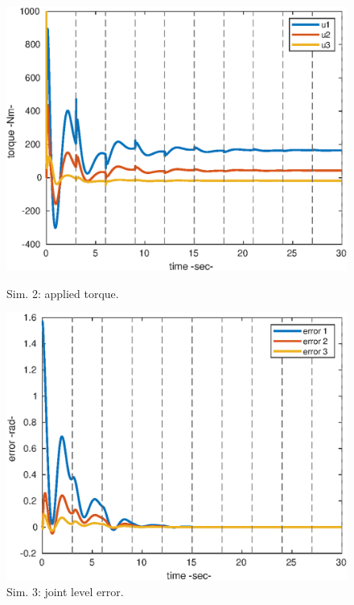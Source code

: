 \begin{center}
\begin{figure}[h!]
\begin{minipage}[h!]{0.45\linewidth}
\begin{center}
    \hspace{-0.1cm}\includegraphics[scale=0.52]{figures/2_1_effort.eps}
    \caption{\label{2_1ceff} 
    Sim. 2: applied torque.}
\end{center}
    \end{minipage}
    \hspace{0.5cm}
    \begin{minipage}[h!]{0.45\linewidth}
    \begin{center}
    \includegraphics[scale=0.52]{figures/2_2_error.eps}
    \caption{\label{2_2err} 
    Sim. 3: joint level error.}
    \vspace{1cm}

\end{center}
\end{minipage}
\end{figure}
\end{center}
